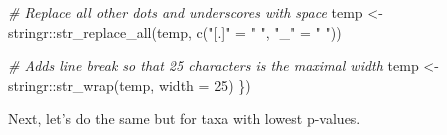 \documentclass[
]{book}
\newenvironment{Shaded}{\begin{snugshade}}{\end{snugshade}}
\newcommand{\AttributeTok}[1]{\textcolor[rgb]{0.77,0.63,0.00}{#1}}
\newcommand{\CommentTok}[1]{\textcolor[rgb]{0.56,0.35,0.01}{\textit{#1}}}
\newcommand{\DecValTok}[1]{\textcolor[rgb]{0.00,0.00,0.81}{#1}}
\newcommand{\FunctionTok}[1]{\textcolor[rgb]{0.00,0.00,0.00}{#1}}
\newcommand{\NormalTok}[1]{#1}
\newcommand{\OtherTok}[1]{\textcolor[rgb]{0.56,0.35,0.01}{#1}}
\newcommand{\SpecialCharTok}[1]{\textcolor[rgb]{0.00,0.00,0.00}{#1}}
\newcommand{\StringTok}[1]{\textcolor[rgb]{0.31,0.60,0.02}{#1}}
\begin{document}
\begin{Shaded}
\begin{Highlighting}[]
  \CommentTok{\# Replace all other dots and underscores with space}
\NormalTok{  temp }\OtherTok{\textless{}{-}}\NormalTok{ stringr}\SpecialCharTok{::}\FunctionTok{str\_replace\_all}\NormalTok{(temp, }\FunctionTok{c}\NormalTok{(}\StringTok{"[.]"} \OtherTok{=} \StringTok{" "}\NormalTok{, }\StringTok{"\_"} \OtherTok{=} \StringTok{" "}\NormalTok{))}
  
  \CommentTok{\# Adds line break so that 25 characters is the maximal width}
\NormalTok{  temp }\OtherTok{\textless{}{-}}\NormalTok{ stringr}\SpecialCharTok{::}\FunctionTok{str\_wrap}\NormalTok{(temp, }\AttributeTok{width =} \DecValTok{25}\NormalTok{)}
\NormalTok{\})}
\end{Highlighting}
\end{Shaded}

Next, let's do the same but for taxa with lowest p-values.
\end{document}
